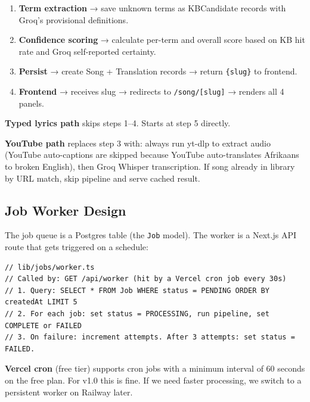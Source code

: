 \documentclass[12pt, a4paper]{article}
\begin{document}
\begin{tcolorbox}[enginebox, title={Full Pipeline (Audio Upload Path)}]
\begin{enumerate}
        Section~\ref{sec:prompt}) → Groq LLaMA 3.3 70B receives lyrics +
        KB context → returns all 4 panels + unknown terms.
  \item \textbf{Term extraction} → save unknown terms as KBCandidate records
        with Groq's provisional definitions.
  \item \textbf{Confidence scoring} → calculate per-term and overall score
        based on KB hit rate and Groq self-reported certainty.
  \item \textbf{Persist} → create Song + Translation records → return
        \texttt{\{slug\}} to frontend.
  \item \textbf{Frontend} → receives slug → redirects to
        \texttt{/song/[slug]} → renders all 4 panels.
\end{enumerate}
\end{tcolorbox}

\vspace{0.5em}

\textbf{Typed lyrics path} skips steps 1--4. Starts at step 5 directly.

\textbf{YouTube path} replaces step 3 with: always run yt-dlp to extract audio
(YouTube auto-captions are skipped because YouTube auto-translates Afrikaans to
broken English), then Groq Whisper transcription. If song already in library
by URL match, skip pipeline and serve cached result.

\subsection{Job Worker Design}

The job queue is a Postgres table (the \texttt{Job} model). The worker is a
Next.js API route that gets triggered on a schedule:

\begin{tcolorbox}[codebox]
\begin{lstlisting}
// lib/jobs/worker.ts
// Called by: GET /api/worker (hit by a Vercel cron job every 30s)
// 1. Query: SELECT * FROM Job WHERE status = PENDING ORDER BY createdAt LIMIT 5
// 2. For each job: set status = PROCESSING, run pipeline, set COMPLETE or FAILED
// 3. On failure: increment attempts. After 3 attempts: set status = FAILED.
\end{lstlisting}
\end{tcolorbox}

\begin{tcolorbox}[warnbox]
  \textbf{Vercel cron} (free tier) supports cron jobs with a minimum interval
  of 60 seconds on the free plan. For v1.0 this is fine. If we need faster
  processing, we switch to a persistent worker on Railway later.
\end{tcolorbox}
\end{document}
